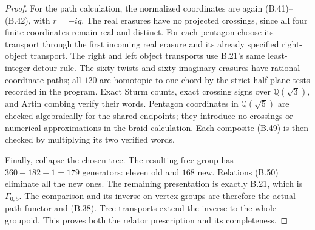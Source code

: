 \begin{proof}
For the path calculation, the normalized coordinates are
again (B.41)--(B.42), with $r=-iq$.  The real erasures
have no projected crossings, since all four finite
coordinates remain real and distinct.  For each pentagon
choose its transport through the first incoming real
erasure and its already specified right-object transport.
The right and left object transports use B.21's same
least-integer detour rule.  The sixty twists and sixty
imaginary erasures have rational coordinate paths;
all $120$ are homotopic to one chord by the strict
half-plane tests recorded in the program.  Exact Sturm
counts, exact crossing signs over $\mathbb Q(\sqrt3)$,
and Artin combing verify their words.  Pentagon coordinates
in $\mathbb Q(\sqrt5)$ are checked algebraically for the
shared endpoints; they introduce no crossings or numerical
approximations in the braid calculation.  Each composite
(B.49) is then checked by multiplying its two verified
words.

Finally, collapse the chosen tree.  The resulting free
group has $360-182+1=179$ generators: eleven old and
$168$ new.  Relations (B.50) eliminate all the new
ones.  The remaining presentation is exactly B.21,
which is $\Gamma_{0,5}$.  The comparison and its inverse
on vertex groups are therefore the actual path functor
and (B.38).  Tree transports extend the inverse to the
whole groupoid.  This proves both the relator prescription
and its completeness.
\end{proof}

